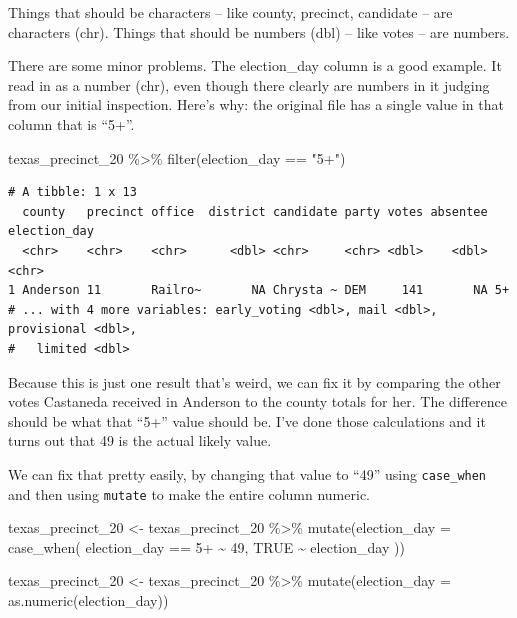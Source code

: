 \documentclass[
  letterpaper,
  DIV=11,
  numbers=noendperiod]{scrreprt}
\newenvironment{Shaded}{\begin{snugshade}}{\end{snugshade}}
\newcommand{\AttributeTok}[1]{\textcolor[rgb]{0.40,0.45,0.13}{#1}}
\newcommand{\ConstantTok}[1]{\textcolor[rgb]{0.56,0.35,0.01}{#1}}
\newcommand{\FunctionTok}[1]{\textcolor[rgb]{0.28,0.35,0.67}{#1}}
\newcommand{\NormalTok}[1]{\textcolor[rgb]{0.00,0.23,0.31}{#1}}
\newcommand{\OtherTok}[1]{\textcolor[rgb]{0.00,0.23,0.31}{#1}}
\newcommand{\SpecialCharTok}[1]{\textcolor[rgb]{0.37,0.37,0.37}{#1}}
\newcommand{\StringTok}[1]{\textcolor[rgb]{0.13,0.47,0.30}{#1}}
\begin{document}
Things that should be characters -- like county, precinct, candidate --
are characters (chr). Things that should be numbers (dbl) -- like votes
-- are numbers.

There are some minor problems. The election\_day column is a good
example. It read in as a number (chr), even though there clearly are
numbers in it judging from our initial inspection. Here's why: the
original file has a single value in that column that is ``5+''.

\begin{Shaded}
\begin{Highlighting}[]
\NormalTok{texas\_precinct\_20 }\SpecialCharTok{\%\textgreater{}\%} \FunctionTok{filter}\NormalTok{(election\_day }\SpecialCharTok{==} \StringTok{"5+"}\NormalTok{)}
\end{Highlighting}
\end{Shaded}

\begin{verbatim}
# A tibble: 1 x 13
  county   precinct office  district candidate party votes absentee election_day
  <chr>    <chr>    <chr>      <dbl> <chr>     <chr> <dbl>    <dbl> <chr>       
1 Anderson 11       Railro~       NA Chrysta ~ DEM     141       NA 5+          
# ... with 4 more variables: early_voting <dbl>, mail <dbl>, provisional <dbl>,
#   limited <dbl>
\end{verbatim}

Because this is just one result that's weird, we can fix it by comparing
the other votes Castaneda received in Anderson to the county totals for
her. The difference should be what that ``5+'' value should be. I've
done those calculations and it turns out that 49 is the actual likely
value.

We can fix that pretty easily, by changing that value to ``49'' using
\texttt{case\_when} and then using \texttt{mutate} to make the entire
column numeric.

\begin{Shaded}
\begin{Highlighting}[]
\NormalTok{texas\_precinct\_20 }\OtherTok{\textless{}{-}}\NormalTok{ texas\_precinct\_20 }\SpecialCharTok{\%\textgreater{}\%}
  \FunctionTok{mutate}\NormalTok{(}\AttributeTok{election\_day =} \FunctionTok{case\_when}\NormalTok{(}
\NormalTok{    election\_day }\SpecialCharTok{==} \StringTok{\textquotesingle{}5+\textquotesingle{}} \SpecialCharTok{\textasciitilde{}} \StringTok{\textquotesingle{}49\textquotesingle{}}\NormalTok{,}
    \ConstantTok{TRUE} \SpecialCharTok{\textasciitilde{}}\NormalTok{ election\_day}
\NormalTok{  ))}

\NormalTok{texas\_precinct\_20 }\OtherTok{\textless{}{-}}\NormalTok{ texas\_precinct\_20 }\SpecialCharTok{\%\textgreater{}\%} \FunctionTok{mutate}\NormalTok{(}\AttributeTok{election\_day =} \FunctionTok{as.numeric}\NormalTok{(election\_day))}
\end{Highlighting}
\end{Shaded}
\end{document}
